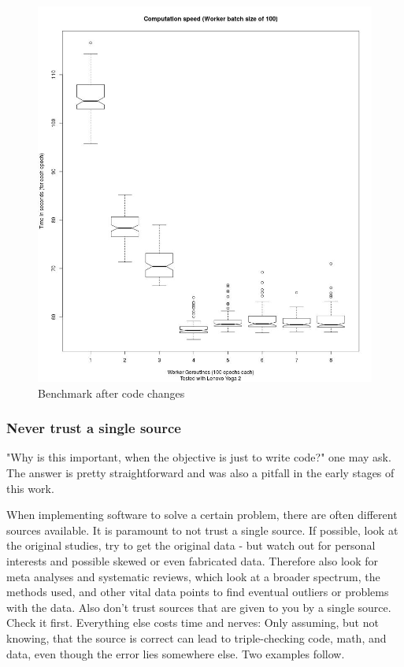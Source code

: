 \documentclass[11pt]{article}
\begin{document}
\begin{figure}[H]
	\includegraphics[width=1.0\textwidth, height=0.75\textheight]{./Data/WrongMath/Images/newAllGoroutines.jpg}
	\vspace{-1em}
	\caption{Benchmark after code changes}
	\vspace{-0.5em}
	\label{fig:newAllGoroutines}
\end{figure}

\subsubsection{Never trust a single source}
"Why is this important, when the objective is just to write code?" one may ask. The answer is pretty straightforward and was also a pitfall in the early stages of this work.

When implementing software to solve a certain problem, there are often different sources available. It is paramount to not trust a single source. If possible, look at the original studies, try to get the original data - but watch out for personal interests and possible skewed or even fabricated data. Therefore also look for meta analyses and systematic reviews, which look at a broader spectrum, the methods used, and other vital data points to find eventual outliers or problems with the data. Also don't trust sources that are given to you by a single source. Check it first. Everything else costs time and nerves: Only assuming, but not knowing, that the source is correct can lead to triple-checking code, math, and data, even though the error lies somewhere else. Two examples follow.
\end{document}
